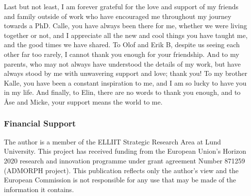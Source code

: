 Last but not least, I am forever grateful for the love and support of my friends and family outside of work who have encouraged me throughout my journey towards a PhD.
Calle, you have always been there for me, whether we were living together or not, and I appreciate all the new and cool things you have taught me, and the good times we have shared.
To Olof and Erik B, despite us seeing each other far too rarely, I cannot thank you enough for your friendship.
And to my parents, who may not always have understood the details of my work, but have always stood by me with unwavering support and love; thank you!
To my brother Kalle, you have been a constant inspiration to me, and I am so lucky to have you in my life.
And finally, to Elin, there are no words to thank you enough, and to {\AA}se and Micke, your support means the world to me.

\subsubsection*{Financial Support}
The author is a member of the ELLIIT Strategic Research Area at Lund University.
This project has received funding from the European Union's Horizon 2020 research and innovation programme under grant agreement Number 871259 (ADMORPH project).
This publication reflects only the author's view and the European Commission is not responsible for any use that may be made of the information it contains.
